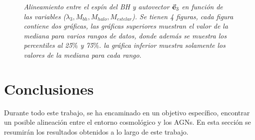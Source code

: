 \begin{figure}
\caption[Alineamiento entre el espín del BH y autovector $\vec{\bf{e}}_3$ en función de las variables ($\lambda_{3}, M_{bh}, M_{halo}\,\, y \,\, M_{estelar}$)]{\emph{Alineamiento entre el espín del BH y autovector $\vec{\bf{e}}_3$ en función de las variables ($\lambda_{3}, M_{bh}, M_{halo}, M_{estelar}$). Se tienen 4 figuras, cada figura contiene dos gráficas, las gráficas superiores muestran el valor de la mediana para varios rangos de datos, donde además se muestra los percentiles al 25$\%$ y 75$\%$. la gráfica inferior muestra solamente los valores de la mediana para cada rango.} }
\label{fig: median dispercion} 
\end{figure}







\newpage
\section{Conclusiones}
\label{sec: conclusiones}
Durante todo este trabajo, se ha encaminado en un objetivo específico, encontrar un posible alineación entre el entorno cosmológico y los AGNs. En esta sección se resumirán los resultados obtenidos a lo largo de este trabajo.

